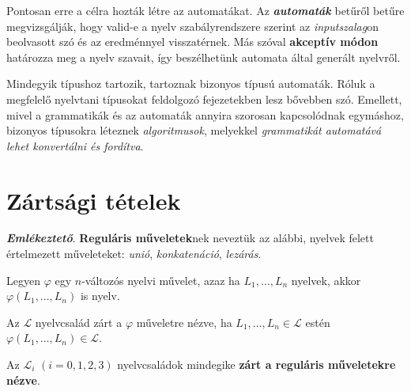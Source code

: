 Pontosan erre a célra hozták létre az automatákat. Az \textbf{\textit{automaták}} betűről betűre megvizsgálják, hogy valid-e a nyelv szabályrendszere szerint az \textit{inputszalag}on beolvasott szó és az eredménnyel visszatérnek. Más szóval \textbf{akceptív módon} határozza meg a nyelv szavait, így beszélhetünk automata által generált nyelvről.

Mindegyik típushoz tartozik, tartoznak bizonyos típusú automaták. Róluk a megfelelő nyelvtani típusokat feldolgozó fejezetekben lesz bővebben szó. Emellett, mivel a grammatikák és az automaták annyira szorosan kapcsolódnak egymáshoz, bizonyos típusokra léteznek \textit{algoritmusok}, melyekkel \textit{grammatikát automatává lehet konvertálni és fordítva}.


\section{Zártsági tételek}

\textit{\textbf{Emlékeztető}}. \textbf{Reguláris műveletek}nek neveztük az alábbi, nyelvek felett értelmezett műveleteket: \textit{unió}, \textit{konkatenáció}, \textit{lezárás}.

Legyen $\varphi$ egy $n$-változós nyelvi művelet, azaz ha $L_1, \dots, L_n$ nyelvek, akkor $\varphi(L_1, \dots, L_n)$ is nyelv.

\begin{tcolorbox}
	\begin{definition}
		Az $\mathcal{L}$ nyelvcsalád zárt a $\varphi$ műveletre nézve,
		ha $L_1, \dots, L_n \in \mathcal{L}$ estén $\varphi(L_1, \dots, L_n) \in \mathcal{L}$.
	\end{definition}
\end{tcolorbox}


\begin{tcolorbox}
	\begin{theorem}
		Az $\mathcal{L}_i$ $(i=0,1,2,3)$ nyelvcsaládok mindegike \textbf{zárt a reguláris műveletekre nézve}.
	\end{theorem}
\end{tcolorbox}

~\\[-2.5em]

